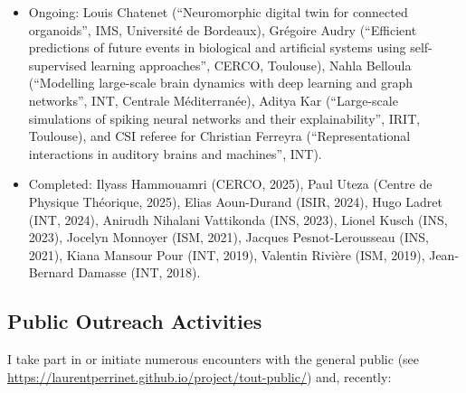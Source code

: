 \documentclass[10pt,english,a4paper,oneside]{article}%
\begin{document}
\begin{itemize}
	\item Ongoing: Louis Chatenet (``Neuromorphic digital twin for connected organoids'', IMS, Université de Bordeaux), Grégoire Audry (``Efficient predictions of future events in biological and artificial systems using self-supervised learning approaches'', CERCO, Toulouse), Nahla Belloula (``Modelling large-scale brain dynamics with deep learning and graph networks'', INT, Centrale Méditerranée), Aditya Kar (``Large-scale simulations of spiking neural networks and their explainability'', IRIT, Toulouse), and CSI referee for Christian Ferreyra (``Representational interactions in auditory brains and machines'', INT).
	\item Completed: Ilyass Hammouamri (CERCO, 2025), Paul Uteza (Centre de Physique Théorique, 2025), Elias Aoun-Durand (ISIR, 2024), Hugo Ladret (INT, 2024), Anirudh Nihalani Vattikonda (INS, 2023), Lionel Kusch (INS, 2023), Jocelyn Monnoyer (ISM, 2021), Jacques Pesnot-Lerousseau (INS, 2021), Kiana Mansour Pour (INT, 2019), Valentin Rivière (ISM, 2019), Jean-Bernard Damasse (INT, 2018).
\end{itemize}

\subsection{Public Outreach Activities} %

I take part in or initiate numerous encounters with the general public (see \url{https://laurentperrinet.github.io/project/tout-public/}) and, recently:
\end{document}
